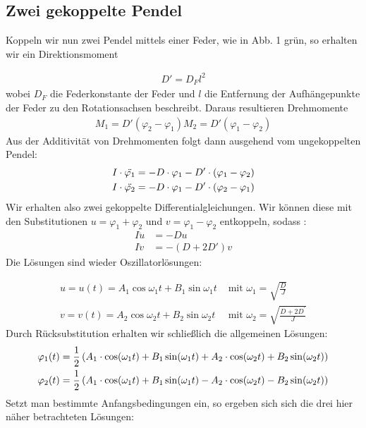 \subsection{Zwei gekoppelte Pendel}
Koppeln wir nun zwei Pendel mittels einer Feder, wie in Abb. 1 grün, 
so erhalten wir ein Direktionsmoment 

\begin{align}
D' = D_F l^2
\end{align}
wobei $D_F$ die Federkonstante der Feder und $l$ die Entfernung der Aufhängepunkte der Feder zu den Rotationsachsen beschreibt. Daraus resultieren Drehmomente 
\begin{align}
M_1=D'(\varphi_2-\varphi_1)
M_2=D'(\varphi_1-\varphi_2)
\end{align}
Aus der Additivität von Drehmomenten folgt dann ausgehend vom ungekoppelten Pendel:
\begin{align}
	I\cdot \ddot{\varphi_1} = -D\cdot\varphi_1-D'\cdot (\varphi_1-\varphi_2)\notag\\
	I\cdot \ddot{\varphi_2} = -D\cdot\varphi_1-D'\cdot (\varphi_2-\varphi_1)\label{eq:K}
\end{align}
Wir erhalten also zwei gekoppelte Differentialgleichungen. Wir können diese mit den Substitutionen $u=\varphi_1+\varphi_2$ und $v=\varphi_1-\varphi_2$ entkoppeln, sodass :
\begin{align}
	I\ddot{u} &= -Du\\
	I\ddot{v} &= -(D+2D')v
\end{align}
Die Lösungen sind wieder Oszillatorlösungen:

\begin{equation}
\begin{array}{ll}
u=u(t)=A_{1} \cos \omega_{1} t+B_{1} \sin \omega_{1} t & \text { mit }  \omega_{1}=\sqrt{\frac{D}{J}} \\
v=v(t)=A_{2} \cos \omega_{2} t+B_{2} \sin \omega_{2} t & \text { mit }  \omega_{2}=\sqrt{\frac{D+2 D^{\prime}}{J}}
\end{array}
\end{equation}
Durch Rücksubstitution erhalten wir schließlich die allgemeinen Lösungen:
\begin{align}
	\varphi_1(t)&= \frac12\left(A_1\cdot \cos(\omega_1t)+B_1\sin(\omega_1t)+A_2\cdot \cos(\omega_2t)+B_2\sin(\omega_2t)\right) \notag\\
	\varphi_2(t)&= \frac12\left(A_1\cdot \cos(\omega_1t)+B_1\sin(\omega_1t)-A_2\cdot \cos(\omega_2t)-B_2\sin(\omega_2t)\right)\label{eq:phi}
\end{align}
Setzt man bestimmte Anfangsbedingungen ein, so ergeben sich sich die drei hier näher betrachteten Lösungen: 
